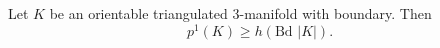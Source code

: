 Let $K$ be an orientable triangulated 3-manifold with boundary. Then
$$p^1(K) \geqslant h(\text{Bd } |K|).$$
